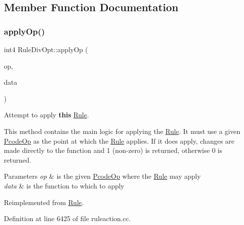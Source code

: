 \subsection{Member Function Documentation}
\mbox{\label{class_rule_div_opt_a8443133b32d917f3b751ba1fa7dee8f1}} 
\subsubsection{\texorpdfstring{applyOp()}{applyOp()}}
{\footnotesize\ttfamily int4 Rule\+Div\+Opt\+::apply\+Op (\begin{DoxyParamCaption}\item[{\mbox{\hyperlink{class_pcode_op}{Pcode\+Op}} $\ast$}]{op,  }\item[{\mbox{\hyperlink{class_funcdata}{Funcdata}} \&}]{data }\end{DoxyParamCaption})\hspace{0.3cm}{\ttfamily [virtual]}}



Attempt to apply {\bfseries{this}} \mbox{\hyperlink{class_rule}{Rule}}. 

This method contains the main logic for applying the \mbox{\hyperlink{class_rule}{Rule}}. It must use a given \mbox{\hyperlink{class_pcode_op}{Pcode\+Op}} as the point at which the \mbox{\hyperlink{class_rule}{Rule}} applies. If it does apply, changes are made directly to the function and 1 (non-\/zero) is returned, otherwise 0 is returned. 
\begin{DoxyParams}{Parameters}
{\em op} & is the given \mbox{\hyperlink{class_pcode_op}{Pcode\+Op}} where the \mbox{\hyperlink{class_rule}{Rule}} may apply \\
\hline
{\em data} & is the function to which to apply \\
\hline
\end{DoxyParams}


Reimplemented from \mbox{\hyperlink{class_rule_a4e3e61f066670175009f60fb9dc60848}{Rule}}.



Definition at line 6425 of file ruleaction.\+cc.

